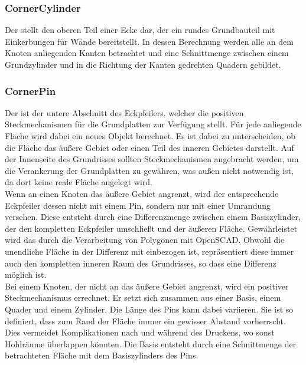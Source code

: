 \subsubsection{CornerCylinder}
Der  stellt den oberen Teil einer Ecke dar, der ein rundes Grundbauteil mit Einkerbungen für Wände bereitstellt.
In dessen Berechnung werden alle an dem Knoten anliegenden Kanten betrachtet und eine Schnittmenge zwischen einem Grundzylinder und in die Richtung der Kanten gedrehten Quadern gebildet. 
\subsubsection{CornerPin}
Der  ist der untere Abschnitt des Eckpfeilers, welcher die positiven Steckmechanismen für die Grundplatten zur Verfügung stellt.
Für jede anliegende Fläche wird dabei ein neues Objekt berechnet.
Es ist dabei zu unterscheiden, ob die Fläche das äußere Gebiet oder einen Teil des inneren Gebietes darstellt.
Auf der Innenseite des Grundrisses sollten Steckmechanismen angebracht werden, um die Verankerung der Grundplatten zu gewähren, was außen nicht notwendig ist, da dort keine reale Fläche angelegt wird.\\ %
Wenn an einen Knoten das äußere Gebiet angrenzt, wird der entsprechende Eckpfeiler dessen nicht mit einem Pin, sondern nur mit einer Umrandung versehen.
Diese entsteht durch eine Differenzmenge zwischen einem Basiszylinder, der den kompletten Eckpfeiler umschließt und der äußeren Fläche.
Gewährleistet wird das durch die Verarbeitung von Polygonen mit OpenSCAD.
Obwohl die unendliche Fläche in der Differenz mit einbezogen ist, repräsentiert diese immer auch den kompletten inneren Raum des Grundrisses, so dass eine Differenz möglich ist.\\
Bei einem Knoten, der nicht an das äußere Gebiet angrenzt, wird ein positiver Steckmechanismus errechnet.
Er setzt sich zusammen aus einer Basis, einem Quader und einem Zylinder.
Die Länge des Pins kann dabei variieren.
Sie ist so definiert, dass zum Rand der Fläche immer ein gewisser Abstand vorherrscht.
Dies vermeidet Komplikationen nach und während des Druckens, wo sonst Hohlräume überlappen könnten.
Die Basis entsteht durch eine Schnittmenge der betrachteten Fläche mit dem Basiszylinders des Pins.\\


